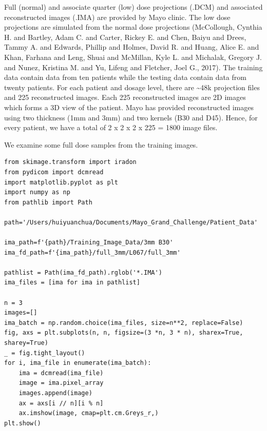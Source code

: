 \documentclass[a4paper, 11pt]{article}
\begin{document}
Full (normal) and associate quarter (low) dose projections (.DCM) and associated reconstructed images (.IMA) are provided by Mayo clinic. The low dose projections are simulated from the normal dose projections (McCollough, Cynthia H. and Bartley, Adam C. and Carter, Rickey E. and Chen, Baiyu and Drees, Tammy A. and Edwards, Phillip and Holmes, David R. and Huang, Alice E. and Khan, Farhana and Leng, Shuai and McMillan, Kyle L. and Michalak, Gregory J. and Nunez, Kristina M. and Yu, Lifeng and Fletcher, Joel G., 2017). The training data contain data from ten patients while the testing data contain data from twenty patients. For each patient and dosage level, there are \textasciitilde{}48k projection files and 225 reconstructed images. Each 225 reconstructed images are 2D images which forms a 3D view of the patient. Mayo has provided reconstructed images using two thickness (1mm and 3mm) and two kernels (B30 and D45). Hence, for every patient, we have a total of 2 x 2 x 2 x 225 = 1800 image files.

We examine some full dose samples from the training images.
\begin{verbatim}
from skimage.transform import iradon
from pydicom import dcmread
import matplotlib.pyplot as plt
import numpy as np
from pathlib import Path

path='/Users/huiyuanchua/Documents/Mayo_Grand_Challenge/Patient_Data'

ima_path=f'{path}/Training_Image_Data/3mm B30'
ima_fd_path=f'{ima_path}/full_3mm/L067/full_3mm'

pathlist = Path(ima_fd_path).rglob('*.IMA')
ima_files = [ima for ima in pathlist]

n = 3
images=[]
ima_batch = np.random.choice(ima_files, size=n**2, replace=False)
fig, axs = plt.subplots(n, n, figsize=(3 *n, 3 * n), sharex=True, sharey=True)
_ = fig.tight_layout()
for i, ima_file in enumerate(ima_batch):
    ima = dcmread(ima_file)
    image = ima.pixel_array
    images.append(image)
    ax = axs[i // n][i % n]
    ax.imshow(image, cmap=plt.cm.Greys_r,)
plt.show()
\end{verbatim}
\end{document}
